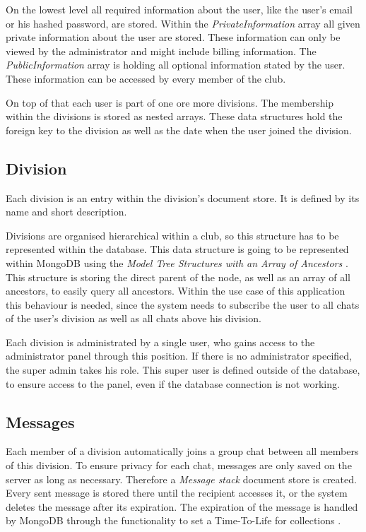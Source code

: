 On the lowest level all required information about the user, like the user's email or his hashed password, are stored. Within the \emph{PrivateInformation} array all given private information about the user are stored. These information can only be viewed by the administrator and might include billing information. The \emph{PublicInformation} array is holding all optional information stated by the user. These information can be accessed by every member of the club.

On top of that each user is part of one ore more divisions. The membership within the divisions is stored as nested arrays. These data structures hold the foreign key to the division as well as the date when the user joined the division.

\subsection{Division}
Each division is an entry within the division's document store. It is defined by its name and short description.

Divisions are organised hierarchical within a club, so this structure has to be represented within the database. This data structure is going to be represented within MongoDB using the \emph{Model Tree Structures with an Array of Ancestors} \cite[p. 149]{Mongo:2014aa}. This structure is storing the direct parent of the node, as well as an array of all ancestors, to easily query all ancestors. Within the use case of this application this behaviour is needed, since the system needs to subscribe the user to all chats of the user's division as well as all chats above his division.

Each division is administrated by a single user, who gains access to the administrator panel through this position. If there is no administrator specified, the super admin takes his role. This super user is defined outside of the database, to ensure access to the panel, even if the database connection is not working.

\subsection{Messages}
Each member of a division automatically joins a group chat between all members of this division. To ensure privacy for each chat, messages are only saved on the server as long as necessary. Therefore a \emph{Message stack} document store is created. Every sent message is stored there until the recipient accesses it, or the system deletes the message after its expiration. The expiration of the message is handled by MongoDB through the functionality to set a Time-To-Life for collections \cite[p. 198]{Mongo:2014aa}.

